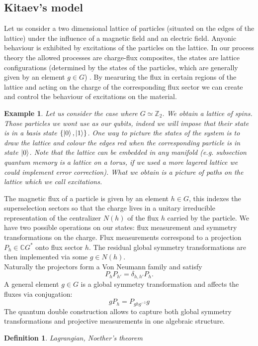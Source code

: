 \documentclass{article}
\newtheorem{definition}{Definition}
\newtheorem{example}{Example}
\begin{document}
\subsection{Kitaev's model}
Let us consider a two dimensional lattice of particles (situated on the edges of the lattice) under the influence of a magnetic field and an electric field. Anyonic behaviour is exhibited by excitations of the particles on the lattice. In our process theory the allowed processes are charge-flux composites, the states are lattice configurations (determined by the states of the particles, which are generally given by an element $g \in G$)  . By mearuring the flux in certain regions of the lattice and acting on the charge of the corresponding flux sector we can create and control the behaviour of excitations on the material.
\begin{example}
	Let us consider the case where $G \simeq \mathbb{Z}_2$. We obtain a lattice of spins. Those particles we wont use as our qubits, indeed we will impose that their state is in a basis state $\{\ket{0},\ket{1}\}$. One way to picture the states of the system is to draw the lattice and colour the edges red when the corresponding particle is in state $\ket{0}$. Note that the lattice can be embedded in any manifold (e.g. subsection quantum memory is a lattice on a torus, if we used a more layered lattice we could implement error correction). What we obtain is a picture of paths on the lattice which we call excitations.
\end{example}
The magnetic flux of a particle is given by an element $h \in G$, this indexes the superselection sectors so that the charge lives in a unitary irreducible representation of the centralizer $N(h)$ of the flux $h$ carried by the particle. We have two possible operations on our states: flux measurement and symmetry transformations on the charge. Flux measurements correspond to a projection $P_h \in \mathbb{C}G^*$ onto flux sector $h$. The residual global symmetry transformations are then implemented via some $g \in N(h)$. \\
Naturally the projectors form a Von Neumann family and satisfy 
$$P_hP_{h'}= \delta_{h,h'} P_h.$$ 
A general element $g \in G$ is a global symmetry transformation and affects the fluxes via conjugation:
\begin{equation}
gP_h = P_{ghg^{-1}}g
\end{equation}
The quantum double construction allows to capture both global symmetry transformations and projective measurements in one algebraic structure.
\begin{definition}
	Lagrangian, Noether's theorem
\end{definition}
\end{document}
